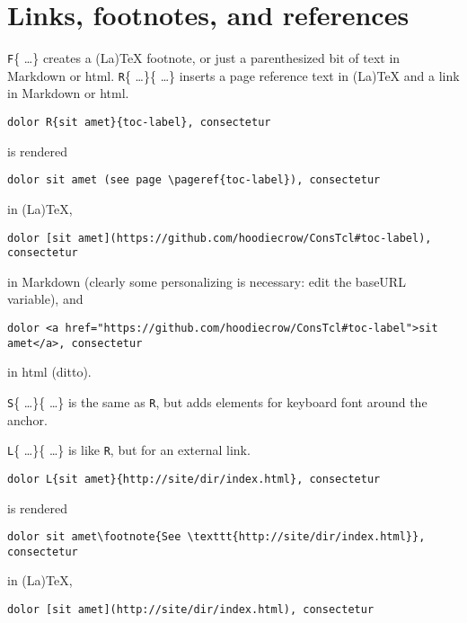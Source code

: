 \section{Links, footnotes, and references}
\label{links-footnotes-and-references}

\texttt{F}\{ \ldots  \} creates a (La)TeX footnote, or just a parenthesized bit of text in Markdown or html. \texttt{R}\{ \ldots  \}\{ \ldots  \} inserts a page reference text in (La)TeX and a link in Markdown or html.

\begin{verbatim}
dolor R{sit amet}{toc-label}, consectetur
\end{verbatim}

is rendered

\begin{verbatim}
dolor sit amet (see page \pageref{toc-label}), consectetur
\end{verbatim}

in (La)TeX,

\begin{verbatim}
dolor [sit amet](https://github.com/hoodiecrow/ConsTcl#toc-label), consectetur
\end{verbatim}

in Markdown (clearly some personalizing is necessary: edit the baseURL variable), and

\begin{verbatim}
dolor <a href="https://github.com/hoodiecrow/ConsTcl#toc-label">sit amet</a>, consectetur
\end{verbatim}

in html (ditto).

\texttt{S}\{ \ldots  \}\{ \ldots  \} is the same as \texttt{R}, but adds elements for keyboard font around the anchor.

\texttt{L}\{ \ldots  \}\{ \ldots  \} is like \texttt{R}, but for an external link.

\begin{verbatim}
dolor L{sit amet}{http://site/dir/index.html}, consectetur
\end{verbatim}

is rendered

\begin{verbatim}
dolor sit amet\footnote{See \texttt{http://site/dir/index.html}}, consectetur
\end{verbatim}

in (La)TeX,

\begin{verbatim}
dolor [sit amet](http://site/dir/index.html), consectetur
\end{verbatim}

